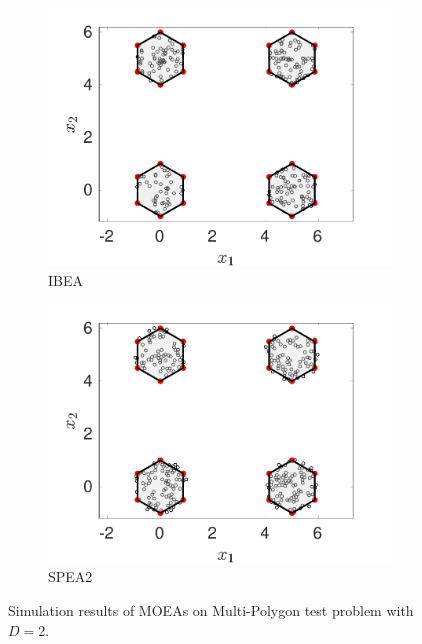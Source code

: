 \documentclass[conference]{IEEEtran}
\begin{document}
\begin{figure}[htbp]
    \begin{subfigure}[b]{.22\textwidth}
    \includegraphics[width=\linewidth]{Section5/dim2/PS/IBEA}
    \caption{IBEA}
    \end{subfigure}
    \begin{subfigure}[b]{.22\textwidth}
    \includegraphics[width=\linewidth]{Section5/dim2/PS/SPEA2}
    \caption{SPEA2}
    \end{subfigure}
    \caption{Simulation results of MOEAs on Multi-Polygon test problem with $D=2$.}
    \label{fig: MOEAs PS dim=2}
\end{figure}
\end{document}
